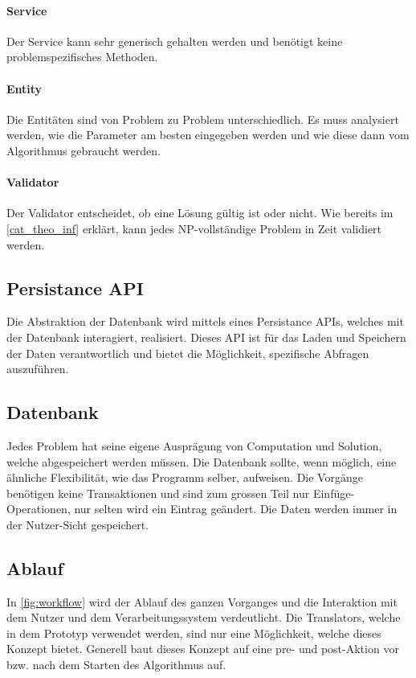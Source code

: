 \paragraph{Service}
Der Service kann sehr generisch gehalten werden und benötigt keine problemspezifisches Methoden. 
\paragraph{Entity}
Die Entitäten sind von Problem zu Problem unterschiedlich. Es muss analysiert werden, wie die Parameter am besten eingegeben werden und wie diese dann vom Algorithmus 
gebraucht werden. 
\paragraph{Validator}
Der Validator entscheidet, ob eine Lösung gültig ist oder nicht. Wie bereits im \autoref{cat_theo_inf} erklärt, kann jedes NP-vollständige Problem in  Zeit validiert werden.

\subsection{Persistance API}
Die Abstraktion der Datenbank wird mittels eines Persistance APIs, welches mit der Datenbank interagiert, realisiert. Dieses API ist für das Laden und Speichern der Daten 
verantwortlich und bietet die Möglichkeit, spezifische Abfragen auszuführen.

\subsection{Datenbank}
Jedes Problem hat seine eigene Ausprägung von Computation und Solution, welche abgespeichert werden müssen. Die Datenbank sollte, wenn möglich, eine ähnliche Flexibilität, wie 
das Programm selber, aufweisen. Die Vorgänge benötigen keine Transaktionen und sind zum grossen Teil nur Einfüge-Operationen, nur selten wird ein Eintrag geändert. Die Daten werden 
immer in der Nutzer-Sicht gespeichert.

\newpage
\subsection{Ablauf}
In \autoref{fig:workflow} wird der Ablauf des ganzen Vorganges und die Interaktion mit dem Nutzer und dem Verarbeitungssystem verdeutlicht. Die Translators, welche in dem 
Prototyp verwendet werden, sind nur eine Möglichkeit, welche dieses Konzept bietet. Generell baut dieses Konzept auf eine pre- und post-Aktion vor bzw. nach dem Starten des Algorithmus 
auf.

